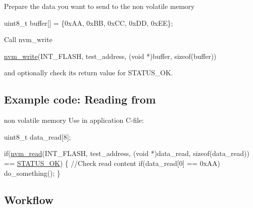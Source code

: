 \begin{DoxyEnumerate}
\item Prepare the data you want to send to the non volatile memory 
\begin{DoxyCode}
 uint8\_t buffer[] = \{0xAA, 0xBB, 0xCC, 0xDD, 0xEE\}; 
\end{DoxyCode}

\item Call nvm\-\_\-write 
\begin{DoxyCode}
 \hyperlink{xmega__nvm_8c_ae2475c24bb003e7e1368d2c488d22db3}{nvm\_write}(INT\_FLASH, test\_address, (\textcolor{keywordtype}{void} *)buffer,
         \textcolor{keyword}{sizeof}(buffer)) 
\end{DoxyCode}
 and optionally check its return value for S\-T\-A\-T\-U\-S\-\_\-\-O\-K.
\end{DoxyEnumerate}\hypertarget{common_nvm_quickstart_nvm_basic_use_case_usage_code_reading}{}\subsection{Example code\-: Reading from}\label{common_nvm_quickstart_nvm_basic_use_case_usage_code_reading}
non volatile memory Use in application C-\/file\-: 
\begin{DoxyCode}
           uint8\_t data\_read[8];

           \textcolor{keywordflow}{if}(\hyperlink{xmega__nvm_8c_a38c20e73ee79e686204f85e88854e5d1}{nvm\_read}(INT\_FLASH, test\_address, (\textcolor{keywordtype}{void} *)data\_read, \textcolor{keyword}{
      sizeof}(data\_read))
         == \hyperlink{group__group__xmega__utils__status__codes_gga751c892e5a46b8e7d282085a5a5bf151a7e4a42e3b6dd63708c64cf3db6f69566}{STATUS\_OK}) \{
             \textcolor{comment}{//Check read content}
             \textcolor{keywordflow}{if}(data\_read[0] == 0xAA)
               do\_something();
           \}
\end{DoxyCode}
\hypertarget{common_nvm_quickstart_nvm_basic_use_case_usage_flow}{}\subsection{Workflow}\label{common_nvm_quickstart_nvm_basic_use_case_usage_flow}

